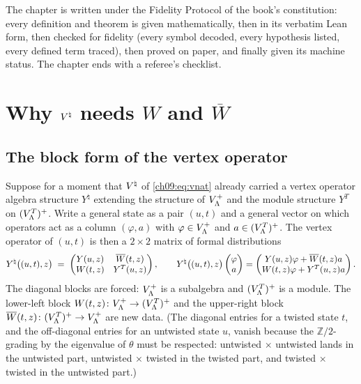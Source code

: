 The chapter is written under the Fidelity Protocol of the book's constitution: every definition
and theorem is given mathematically, then in its verbatim Lean form, then checked for fidelity
(every symbol decoded, every hypothesis listed, every defined term traced), then proved on
paper, and finally given its machine status. The chapter ends with a referee's checklist.

\section{Why \texorpdfstring{${V^{\natural}}$}{V-natural} needs \texorpdfstring{$W$}{W} and \texorpdfstring{$\overline{W}$}{Wbar}}\label{ch09:sec:why}

\subsection{The block form of the vertex operator}

Suppose for a moment that ${V^{\natural}}$ of \eqref{ch09:eq:vnat} already carried a vertex operator
algebra structure $Y^\natural$ extending the structure of $V_{\Lambda}^{+}$ and the module structure
$Y^T$ on $(V_{\Lambda}^{T})^{+}$. Write a general state as a pair $(u,t)$ and a general vector on which
operators act as a column $(\varphi,a)$ with $\varphi\in V_{\Lambda}^{+}$ and $a\in(V_{\Lambda}^{T})^{+}$. The
vertex operator of $(u,t)$ is then a $2\times 2$ matrix of formal distributions
\begin{equation}\label{ch09:eq:block}
  Y^\natural\big((u,t),z\big) \;=\;
  \begin{pmatrix} Y(u,z) & \overline{W}(t,z) \\ W(t,z) & Y^T(u,z)\end{pmatrix},
  \qquad
  Y^\natural\big((u,t),z\big)\begin{pmatrix}\varphi\\ a\end{pmatrix}
  =\begin{pmatrix} Y(u,z)\varphi + \overline{W}(t,z)a\\ W(t,z)\varphi + Y^T(u,z)a\end{pmatrix}.
\end{equation}
The diagonal blocks are forced: $V_{\Lambda}^{+}$ is a subalgebra and $(V_{\Lambda}^{T})^{+}$ is a module. The
lower-left block $W(t,z)\colon V_{\Lambda}^{+}\to(V_{\Lambda}^{T})^{+}$ and the upper-right block
$\overline{W}(t,z)\colon(V_{\Lambda}^{T})^{+}\to V_{\Lambda}^{+}$ are new data. (The diagonal entries for a twisted
state $t$, and the off-diagonal entries for an untwisted state $u$, vanish because the
$\mathbb{Z}/2$-grading by the eigenvalue of $\theta$ must be respected: untwisted $\times$
untwisted lands in the untwisted part, untwisted $\times$ twisted in the twisted part, and twisted
$\times$ twisted in the untwisted part.)

